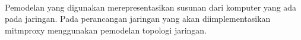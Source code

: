 \documentclass[./bab_3.tex]{subfiles}
\begin{document}
  \paragraph*{}Pemodelan yang digunakan merepresentasikan
  susunan dari komputer yang ada pada jaringan. Pada
  perancangan jaringan yang akan diimplementasikan mitmproxy
  menggunakan pemodelan topologi jaringan.
\end{document}
